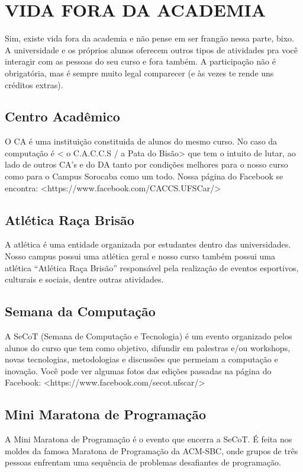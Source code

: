 \section{VIDA FORA DA ACADEMIA}
Sim, existe vida fora da academia e não pense em ser frangão nessa parte, bixo. A universidade e os próprios alunos oferecem outros tipos de atividades pra você interagir com as pessoas do seu curso e fora também. A participação não é obrigatória, mas é sempre muito legal comparecer (e às vezes te rende uns créditos extras).

\subsection{Centro Acadêmico}
O CA é uma instituição constituida de alunos do mesmo curso. No caso da computação é  < o C.A.C.C.S / a Pata do Bisão> que tem o intuito de lutar, ao lado de outros CA’s e do DA tanto por condições melhores para o nosso curso como para o Campus Sorocaba como um todo. Nossa página do Facebook se encontra: \newline <https://www.facebook.com/CACCS.UFSCar/>

\subsection{Atlética Raça Brisão}
A atlética é uma entidade organizada por estudantes dentro das universidades. Nosso campus possui uma atlética geral e nosso curso também possui uma atlética “Atlética Raça Brisão” responsável  pela   realização   de eventos esportivos, culturais  e  sociais, dentre outras atividades.

\subsection{Semana da Computação}
A SeCoT (Semana de Computação e Tecnologia) é um evento organizado pelos alunos do curso que tem como objetivo, difundir em palestras e/ou workshops, novas tecnologias, metodologias e discussões que permeiam a computação e inovação. Você pode ver algumas fotos das edições passadas na página do Facebook: \newline <https://www.facebook.com/secot.ufscar/>

\subsection{Mini Maratona de Programação}
A Mini Maratona de Programação é o evento que encerra a SeCoT. É feita nos moldes da famosa Maratona de Programação da ACM-SBC, onde grupos de três pessoas enfrentam uma sequência de problemas desafiantes de programação.

